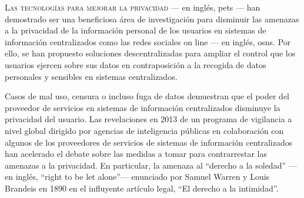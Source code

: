 


    
    {
    \lettrine{\textcolor[gray]{.25}{L}}{as tecnologías para mejorar la privacidad}\csname@restorepar\endcsname\everypar{} 
    --- en inglés, \aclp*{pet} --- han demostrado 
    ser una beneficiosa área de investigación para disminuir las amenazas a la privacidad 
    de la información personal de los usuarios en sistemas de información centralizados 
    como las redes sociales on line --- en inglés, \aclp*{osn}. Por ello, se 
    han propuesto soluciones descentralizadas para ampliar el control que los usuarios 
    ejercen sobre sus datos en contraposición a la recogida de datos personales 
    y sensibles en sistemas centralizados.\par
    }
    
    Casos de mal uso, censura o incluso fuga de datos demuestran que el poder del 
    proveedor de servicios en sistemas de información centralizados disminuye la 
    privacidad del usuario. Las revelaciones en 2013 de un programa de vigilancia 
    a nivel global dirigido por agencias de inteligencia públicas en colaboración 
    con algunos de los proveedores de servicios de sistemas de información centralizados 
    han acelerado el debate sobre las medidas a tomar para contrarrestar las amenazas 
    a la privacidad. En particular, la amenaza al ``derecho a la soledad'' --- en 
    inglés, ``right to be let alone''--- enunciado por Samuel Warren y Louis Brandeis 
    en 1890 en el influyente artículo legal, ``El derecho a la intimidad''.
    
